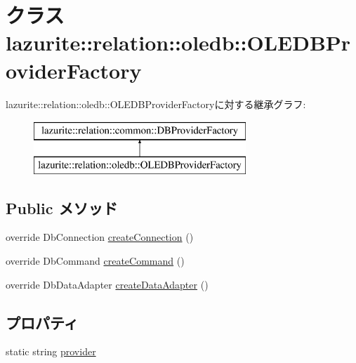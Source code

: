 \hypertarget{classlazurite_1_1relation_1_1oledb_1_1_o_l_e_d_b_provider_factory}{
\section{クラス lazurite::relation::oledb::OLEDBProviderFactory}
\label{classlazurite_1_1relation_1_1oledb_1_1_o_l_e_d_b_provider_factory}
}
lazurite::relation::oledb::OLEDBProviderFactoryに対する継承グラフ:\begin{figure}[H]
\begin{center}
\leavevmode
\includegraphics[height=2cm]{classlazurite_1_1relation_1_1oledb_1_1_o_l_e_d_b_provider_factory}
\end{center}
\end{figure}
\subsection*{Public メソッド}
\begin{DoxyCompactItemize}
\item 
override DbConnection \hyperlink{classlazurite_1_1relation_1_1oledb_1_1_o_l_e_d_b_provider_factory_a3f9cfbeba5e17982171b58079d9f4067}{createConnection} ()
\item 
override DbCommand \hyperlink{classlazurite_1_1relation_1_1oledb_1_1_o_l_e_d_b_provider_factory_a9cf2e12a8efe659885fd1e5fa014243f}{createCommand} ()
\item 
override DbDataAdapter \hyperlink{classlazurite_1_1relation_1_1oledb_1_1_o_l_e_d_b_provider_factory_a38fa9d782201330de88cf58b84f16df2}{createDataAdapter} ()
\end{DoxyCompactItemize}
\subsection*{プロパティ}
\begin{DoxyCompactItemize}
\item 
static string \hyperlink{classlazurite_1_1relation_1_1oledb_1_1_o_l_e_d_b_provider_factory_a536ab20f0ab680c04a69b0ce0f4dc15d}{provider}
\end{DoxyCompactItemize}


